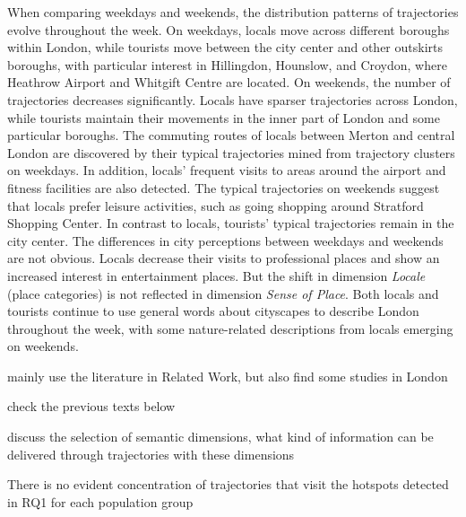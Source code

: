 \documentclass{article}
\theoremstyle{remark}
\begin{document}
When comparing weekdays and weekends, the distribution patterns of trajectories evolve throughout the week. On weekdays, locals move across different boroughs within London, while tourists move between the city center and other outskirts boroughs, with particular interest in Hillingdon, Hounslow, and Croydon, where Heathrow Airport and Whitgift Centre are located. On weekends, the number of trajectories decreases significantly. Locals have sparser trajectories across London, while tourists maintain their movements in the inner part of London and some particular boroughs. The commuting routes of locals between Merton and central London are discovered by their typical trajectories mined from trajectory clusters on weekdays. In addition, locals' frequent visits to areas around the airport and fitness facilities are also detected. The typical trajectories on weekends suggest that locals prefer leisure activities, such as going shopping around Stratford Shopping Center. In contrast to locals, tourists' typical trajectories remain in the city center. The differences in city perceptions between weekdays and weekends are not obvious. Locals decrease their visits to professional places and show an increased interest in entertainment places. But the shift in dimension \textit{Locale} (place categories) is not reflected in dimension \textit{Sense of Place}. Both locals and tourists continue to use general words about cityscapes to describe London throughout the week, with some nature-related descriptions from locals emerging on weekends.


mainly use the literature in Related Work, but also find some studies in London

check the previous texts below

discuss the selection of semantic dimensions, what kind of information can be delivered through trajectories with these dimensions

There is no evident concentration of trajectories that visit the hotspots detected in RQ1 for each population group
\end{document}
